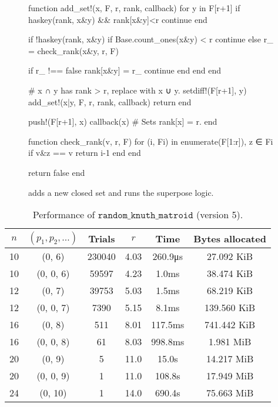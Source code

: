 \begin{figure}
  \begin{jllisting}
function add_set!(x, F, r, rank, callback)
  for y in F[r+1]
    if haskey(rank, x&y) && rank[x&y]<r
      continue
    end

    if !haskey(rank, x&y)
      if Base.count_ones(x&y) < r
        continue
      else      
        r_ = check_rank(x&y, r, F)
        
        if r_ !== false
          rank[x&y] = r_
          continue
        end
      end
    end

    # x ∩ y has rank > r, replace with x ∪ y.
    setdiff!(F[r+1], y)
    add_set!(x|y, F, r, rank, callback)
    return
  end

  push!(F[r+1], x)
  callback(x) # Sets rank[x] = r.
end

function check_rank(v, r, F)
  for (i, Fi) in enumerate(F[1:r]), z ∈ Fi
    if v&z == v
      return i-1
    end
  end

  return false
end
  \end{jllisting}
  \caption{ adds a new closed set and runs the superpose logic.}
  \label{code:add_set}
\end{figure}

\begin{table}
  \centering
  \begin{tabular}{cccccc}
    \toprule
      $n$ & $(p_1, p_2, \ldots)$ & Trials & $r$   & Time    & Bytes allocated \\
    \midrule
      10  & (0, 6)    & 230040 & 4.03  & 260.9\unit{\us} & 27.092 KiB     \\
      10  & (0, 0, 6) & 59597  & 4.23  & 1.0ms           & 38.474 KiB     \\
      12  & (0, 7)    & 39753  & 5.03  & 1.5ms           & 68.219 KiB     \\
      12  & (0, 0, 7) & 7390   & 5.15  & 8.1ms           & 139.560 KiB     \\
      16  & (0, 8)    & 511    & 8.01  & 117.5ms         & 741.442 KiB     \\
      16  & (0, 0, 8) & 61     & 8.03  & 998.8ms         & 1.981 MiB     \\
      20  & (0, 9)    & 5      & 11.0  & 15.0s           & 14.217 MiB     \\
      20  & (0, 0, 9) & 1      & 11.0  & 108.8s          & 17.949 MiB     \\
      24  & (0, 10)   & 1      & 14.0  & 690.4s          & 75.663 MiB     \\
    \bottomrule
    \end{tabular}
  \caption{Performance of $\texttt{random\_knuth\_matroid}$ (version 5).}
  \label{tab:perf_v5}
\end{table}

